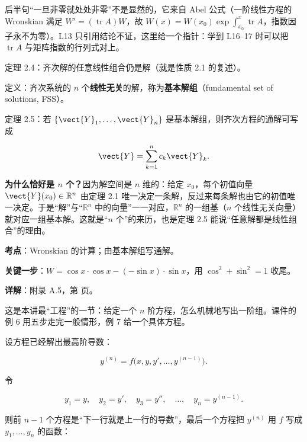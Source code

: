 \documentclass[11pt]{ctexart}
\renewcommand{\qbreak}{\needspace{0.26\textheight}}
\newcommand{\tr}{\operatorname{tr}}
\begin{document}
后半句“一旦非零就处处非零”不是显然的，它来自 Abel 公式（一阶线性方程的 Wronskian 满足 $W'=(\tr A)W$，故 $W(x)=W(x_0)\exp\int_{x_0}^{x}\tr A$，指数因子永不为零）。L13 只引用结论不证，这里给一个指针：学到 L16--17 时可以把 $\tr A$ 与矩阵指数的行列式对上。


定理 2.4：齐次解的任意线性组合仍是解（就是性质 2.1 的复述）。

定义：齐次系统的 $n$ 个\textbf{线性无关}的解，称为\textbf{基本解组}（fundamental set of solutions, FSS）。

定理 2.5：若 $\{\vect{Y}_1,\dots,\vect{Y}_n\}$ 是基本解组，则齐次方程的通解可写成

\[
\vect{Y}=\sum_{k=1}^{n}c_k\vect{Y}_k .
\]

\textbf{为什么恰好是 $n$ 个？}因为解空间是 $n$ 维的：给定 $x_0$，每个初值向量 $\vect{Y}(x_0)\in\mathbb{R}^n$ 由定理 2.1 唯一决定一条解，反过来每条解也由它的初值唯一决定。于是“解”与“$\mathbb{R}^n$ 中的向量”一一对应，$\mathbb{R}^n$ 的一组基（$n$ 个线性无关向量）就对应一组基本解。这就是“$n$ 个”的来历，也是定理 2.5 能说“任意解都是线性组合”的理由。


\qbreak
{}
\par\textbf{考点}：Wronskian 的计算；由基本解组写通解。
\par\textbf{关键一步}：$W=\cos x\cdot\cos x-(-\sin x)\cdot\sin x$，用 $\cos^2+\sin^2=1$ 收尾。
\par\textbf{详解}：附录 A.5，第 \pageref{c1:app:a5} 页。


这是本讲最“工程”的一节：给定一个 $n$ 阶方程，怎么机械地写出一阶组。课件的例 6 用五步走完一般情形，例 7 给一个具体方程。


设方程已经解出最高阶导数：

\[
y^{(n)}=f\bigl(x,y,y',\dots,y^{(n-1)}\bigr).
\]

令

\[
y_1=y,\quad y_2=y',\quad y_3=y'',\quad \dots,\quad y_n=y^{(n-1)} .
\]

则前 $n-1$ 个方程是“下一行就是上一行的导数”，最后一个方程把 $y^{(n)}$ 用 $f$ 写成 $y_1,\dots,y_n$ 的函数：
\end{document}
